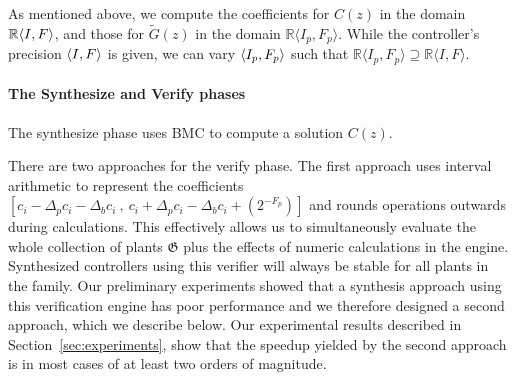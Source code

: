 \documentclass{sig-alternate-05-2015}
\begin{document}
As mentioned above, we compute the coefficients for $C(z)$ 
in the domain $\mathbb{R}\langle{I},{F}\rangle$, 
and those for $\tilde G(z)$ in the domain
$\mathbb{R}\langle I_p,F_p \rangle$.
While the controller's precision $\langle{I},{F}\rangle$ is given, 
we can vary $\langle{I_p},{F_p}\rangle$ such that 
$\mathbb{R}\langle I_p,F_p \rangle \supseteq \mathbb{R}\langle I,F \rangle$.

\paragraph{The {\sc Synthesize} and {\sc Verify} phases}
The {\sc synthesize} phase uses BMC to 
compute a solution $C(z)$. %

There are two approaches for the {\sc verify} phase.
The first approach uses interval arithmetic \cite{moore1966interval}
to represent the coefficients
$[{c}_i-\Delta_p{c}_i-\Delta_b{c}_i\ ,\
{c}_i+\Delta_p{c}_i-\Delta_b{c}_i+(2^{-F_p})]$ 
and rounds operations outwards during calculations. This effectively allows
us to simultaneously evaluate the whole collection of plants $\mathfrak{G}$
plus the effects of numeric calculations in the engine.
Synthesized controllers using this verifier will always
be stable for all plants in the family.
Our preliminary experiments showed that a synthesis approach
using this verification engine has poor performance and we
therefore designed a second approach, which we describe below.
Our experimental results described in Section~\ref{sec:experiments}, 
show that the speedup yielded by the second approach 
is in most cases of at least two orders of magnitude.
\end{document}
